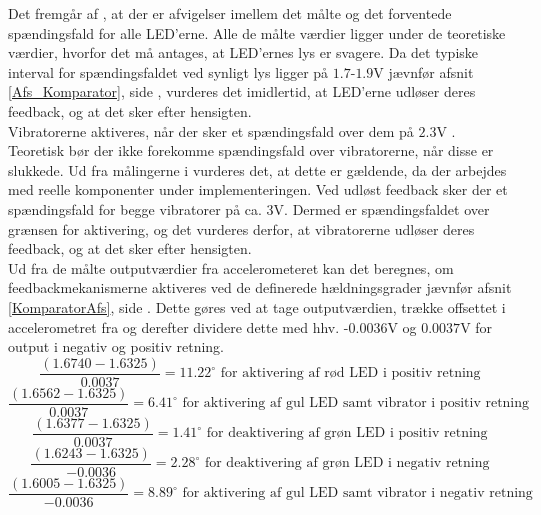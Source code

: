 \noindent Det fremgår af , at der er afvigelser imellem det målte og det forventede spændingsfald for alle LED'erne. Alle de målte værdier ligger under de teoretiske værdier, hvorfor det må antages, at LED'ernes lys er svagere. Da det typiske interval for spændingsfaldet ved synligt lys ligger på $1.7$-$1.9$V jævnfør afsnit \ref{Afs_Komparator}, side \pageref{Afs_Komparator}, vurderes det imidlertid, at LED'erne udløser deres feedback, og at det sker efter hensigten.\\
Vibratorerne aktiveres, når der sker et spændingsfald over dem på $2.3$V \cite{Machinery2009}. Teoretisk bør der ikke forekomme spændingsfald over vibratorerne, når disse er slukkede. Ud fra målingerne i  vurderes det, at dette er gældende, da der arbejdes med reelle komponenter under implementeringen. Ved udløst feedback sker der et spændingsfald for begge vibratorer på ca. $3$V. Dermed er spændingsfaldet over grænsen for aktivering, og det vurderes derfor, at vibratorerne udløser deres feedback, og at det sker efter hensigten. \\
Ud fra de målte outputværdier fra accelerometeret kan det beregnes, om feedbackmekanismerne aktiveres ved de definerede hældningsgrader jævnfør afsnit \ref{KomparatorAfs}, side \pageref{KomparatorAfs}. Dette gøres ved at tage outputværdien, trække offsettet i accelerometret fra og derefter dividere dette med hhv. -$0.0036$V og $0.0037$V for output i negativ og positiv retning. \\
\begin{equation}\label{eq:graderLED_2}
\dfrac{(1.6740 - 1.6325)}{0.0037} = 11.22^{\circ}\text{ for aktivering af rød LED i positiv retning}
\end{equation}
\begin{equation}
\dfrac{(1.6562 - 1.6325)}{0.0037} = 6.41^{\circ}\text{ for aktivering af gul LED samt vibrator i positiv retning}
\end{equation}
\begin{equation}
\dfrac{(1.6377 - 1.6325)}{0.0037} = 1.41^{\circ}\text{ for deaktivering af grøn LED i positiv retning}
\end{equation}
\begin{equation}
\dfrac{(1.6243 - 1.6325)}{-0.0036} = 2.28^{\circ}\text{ for deaktivering af grøn LED i negativ retning}
\end{equation}
\begin{equation}
\dfrac{(1.6005 - 1.6325)}{-0.0036} = 8.89^{\circ}\text{ for aktivering af gul LED samt vibrator i negativ retning}
\end{equation} 
